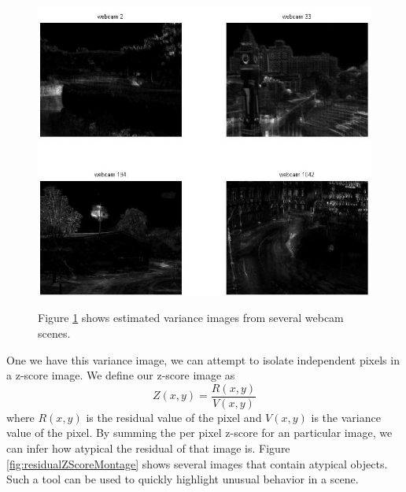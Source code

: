 \begin{figure}
	\centering
		\includegraphics[width=1\textwidth]{figures/severalVarianceImages.jpg}
	\label{fig:severalVarianceImages}
	
		\caption[Several variance images.]{Figure \ref{fig:severalVarianceImages} shows estimated variance images from several webcam scenes.}
\end{figure}

One we have this variance image, we can attempt to isolate independent pixels in a z-score image.  We define our z-score image as $$Z(x,y) = \frac{R(x,y)} { V(x,y)}$$ where $R(x,y)$ is the residual value of the pixel and $V(x,y)$ is the variance value of the pixel.  By summing the per pixel z-score for an particular image, we can infer how atypical the residual of that image is.  Figure \ref{fig:residualZScoreMontage} shows several images that contain atypical objects.  Such a tool can be used to quickly highlight unusual behavior in a scene.

